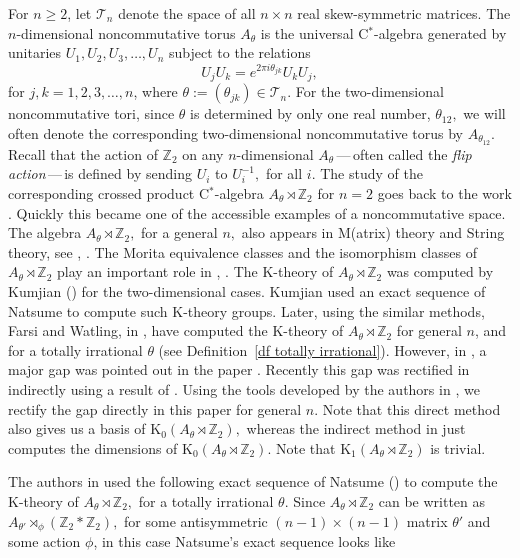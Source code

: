 \documentclass[9pt, BCOR=2mm]{amsart}
\numberwithin{equation}{section}
\numberwithin{equation}{section}
\newcommand{\Z}{{\mathbb{Z}}}
\newcommand{\K}{\mathrm{K}} %
\begin{document}
For $n \geq 2$, let $\mathcal{T}_{n}$ denote the space of all $n \times n$ real skew-symmetric  matrices. The $n$-dimensional noncommutative torus $A_{\theta}$ is
the universal C$^*$-algebra  generated by unitaries $U_1, U_2, U_3, \ldots, U_n$
subject to the relations 
\begin{equation}\label{eq:ccr}
	 U_jU_k = e^ {2 \pi i \theta_{jk} }U_k U_j, 
\end{equation}
for $j, k = 1, 2, 3, \ldots, n$, where $\theta:=(\theta_{jk}) \in \mathcal{T}_{n}$. For the two-dimensional noncommutative tori, since $\theta$ is determined by only one real number, $\theta_{12},$ we will often denote  the corresponding two-dimensional noncommutative torus by $A_{\theta_{12}}$. Recall that the action of $\Z_2$ on any $n$-dimensional $A_{\theta}$\,---\,often called the \emph{flip action}\,---\,is defined by sending $U_i$ to $U_i^{-1},$ for all $i.$ The study of the corresponding crossed product C$^*$-algebra $A_\theta \rtimes \Z_2$ for $n=2$ goes back to the work \cite{BEEK91}. Quickly this became one of the accessible examples of a noncommutative space. The algebra $A_\theta \rtimes \Z_2,$ for a general $n,$ also appears in M(atrix) theory and String theory, see \cite{KS00}, \cite{KS02}. The Morita equivalence classes and the isomorphism classes of $A_\theta \rtimes \Z_2$ play an important role in \cite{KS00}, \cite{KS02}. The K-theory of $A_\theta \rtimes \Z_2$ was computed by Kumjian (\cite{Kum90}) for the two-dimensional cases. Kumjian used an exact sequence of Natsume to compute such K-theory groups. Later, using the similar methods, Farsi and Watling, in \cite{FW93}, have computed the K-theory of $A_\theta \rtimes \Z_2$ for general $n$, and for a totally irrational $\theta$ (see Definition~\ref{df totally irrational}).  However, in \cite{CL19}, a major gap was pointed out in the paper \cite{FW93}. Recently this gap was rectified in \cite{CFW22} indirectly  using a result of \cite{Boc97}.  Using the tools developed by the authors in \cite{CL19}, we rectify the gap directly in this paper for general $n.$ Note that this direct method also gives us a basis of $\K_0 (A_{\theta}\rtimes  \Z_2),$ whereas the indirect method in \cite{CFW22} just computes the dimensions of  $\K_0 (A_{\theta}\rtimes  \Z_2).$ Note that $\K_1(A_{\theta}\rtimes \Z_2)$ is trivial.    


The authors in \cite{FW93} used the following exact sequence of Natsume (\cite{Nat85}) to compute the K-theory of $A_\theta \rtimes \Z_2,$ for a totally irrational $\theta.$  Since $A_\theta \rtimes \Z_2$ can be written as $A_{\theta'}\rtimes_\phi (\mathbb{Z}_2 * \mathbb{Z}_2 ),$ for some antisymmetric $(n-1)\times (n-1)$ matrix $\theta'$ and some action $\phi$, in this case Natsume's exact sequence looks like 
\end{document}
